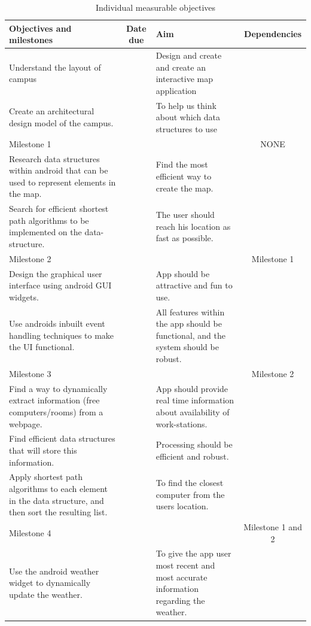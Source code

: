 \documentclass[10pt,a4paper,oneside]{report}
\begin{document}
\begin{table}[H]
\caption{Individual measurable objectives}
\hspace*{-2cm}
\begin{tabularx}{1.3\textwidth}{ |S|E|S|E| }
  \hline
  \bf{Objectives and milestones} & \bf{Date due} & \bf{Aim} & \bf{Dependencies} \\ \hline
  Understand the layout of campus & ~ &
  Design and create and create an interactive map application & ~ \\ \hline
  Create an architectural design model of the campus. & ~ &
  To help us think about which data structures to use & ~ \\ \hline
  Milestone 1 & ~ & ~ & NONE \\ \hline
  Research data structures within android that can be used to represent elements in the map. & ~ & Find the most efficient way to create the map. & ~ \\ \hline
  Search for efficient shortest path algorithms to be implemented on the data-structure. & ~ & The user should reach his location as fast as possible. & ~ \\ \hline
  Milestone 2 & ~ & ~ &Milestone 1 \\ \hline
  Design the graphical user interface using android GUI widgets. & ~ & App should be attractive and fun to use. & \\ \hline
  Use androids inbuilt event handling techniques to make the UI functional. & ~ & All features within the app should be functional, and the system should be robust. & ~ \\ \hline
  Milestone 3 & ~ & ~ & Milestone 2 \\ \hline
  Find a way to dynamically extract information (free computers/rooms) from a webpage. & ~ & App should provide real time information about availability of work-stations. & ~\\ \hline
  Find efficient data structures that will store this information. & ~ & Processing should be efficient and robust. & ~ \\ \hline
  Apply shortest path algorithms to each element in the data structure, and then sort the resulting list. & ~ & To find the closest computer from the users location. & ~\\ \hline
  Milestone 4 & ~ & ~ & Milestone 1 and 2 \\ \hline
  Use the android weather widget to dynamically update the weather. & ~ & To give the app user most recent and most accurate information regarding the weather. & ~ \\ \hline

\end{tabularx}
\end{table}
\end{document}
